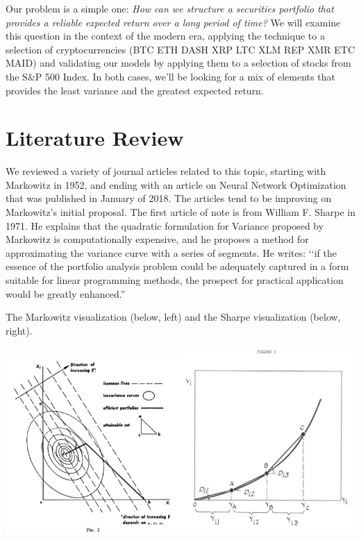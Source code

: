 \documentclass[11pt]{article} %
\begin{document}
Our problem is a simple one:\emph{ How can we structure a securities portfolio that provides a reliable expected return over a long period of time?} We will examine this question in the context of the modern era, applying the technique to a selection of cryptocurrencies (BTC ETH DASH XRP LTC XLM REP XMR ETC MAID) and validating our models by applying them to a selection of stocks from the S\&P 500 Index. In both cases, we’ll be looking for a mix of elements that provides the least variance and the greatest expected return. 

\section{Literature Review}

We reviewed a variety of journal articles related to this topic, starting with Markowitz in 1952, and ending with an article on Neural Network Optimization that was published in January of 2018. The articles tend to be improving on Markowitz’s initial proposal. The first article of note is from William F. Sharpe in 1971. He explains that the quadratic formulation for Variance proposed by Markowitz is computationally expensive, and he proposes a method for approximating the variance curve with a series of segments. He writes: ‘‘if the essence of the portfolio analysis problem could be adequately captured in a form suitable for linear programming methods, the prospect for practical application would be greatly enhanced.”  \cite{sharpe71}

The Markowitz visualization (below, left) and the Sharpe visualization (below, right).

\includegraphics[width=0.5\textwidth]{mark1}\includegraphics[width=0.5\textwidth]{sharpe1}
    
\end{document}
